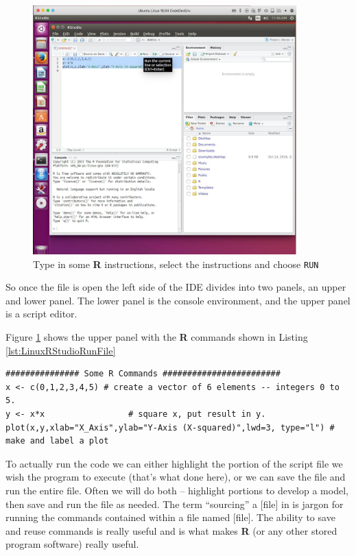\begin{figure}[h!] %
   \centering
   \includegraphics[width=4in]{./1-Introduction/LinuxRStudioRunFile.jpg} 
   \caption{Type in some \textbf{R} instructions, select the instructions and choose \texttt{RUN}}
   \label{fig:LinuxRStudioRunFile}
\end{figure}

So once the file is open the left side of the IDE divides into two panels, an upper and lower panel.
The lower panel is the console environment, and the upper panel is a script editor.

Figure \ref{fig:LinuxRStudioRunFile} shows the upper panel with the \textbf{R} commands shown in Listing \ref{lst:LinuxRStudioRunFile}

\begin{lstlisting}[caption=R code demonstrating a few commands \\ This fragment of code generates two vectors X and Y and then plots them, label=lst:LinuxRStudioRunFile]
############### Some R Commands ########################
x <- c(0,1,2,3,4,5) # create a vector of 6 elements -- integers 0 to 5.
y <- x*x                 # square x, put result in y.
plot(x,y,xlab="X_Axis",ylab="Y-Axis (X-squared)",lwd=3, type="l") # make and label a plot
\end{lstlisting}  

To actually run the code we can either highlight the portion of the script file we wish the program to execute (that's what done here), or we can save the file and run the entire file.
Often we will do both -- highlight portions to develop a model, then save and run the file as needed.
The term ``sourcing'' a [file] in  is jargon for running the commands contained within a file named [file].
The ability to save and reuse commands is really useful and is what makes \textbf{R} (or any other stored program software) really useful.

